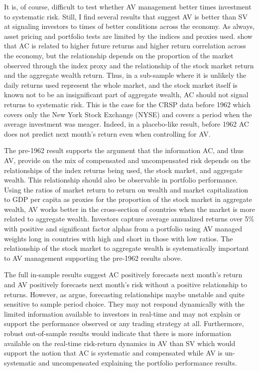 It is, of course, difficult to test whether AV management better times investment to systematic risk. Still, I find several results that suggest AV is better than SV at signaling investors to times of better conditions across the economy. As always, asset pricing and portfolio tests are limited by the indices and proxies used. \citet{pollet_average_2010} show that AC is related to higher future returns and higher return correlation across the economy, but the relationship depends on the proportion of the market observed through the index proxy and the relationship of the stock market return and the aggregate wealth return. Thus, in a sub-sample where it is unlikely the daily returns used represent the whole market, and the stock market itself is known not to be an insignificant part of aggregate wealth, AC should not signal returns to systematic risk. This is the case for the CRSP data before 1962 which covers only the New York Stock Exchange (NYSE) and covers a period when the average investment was meager. \citep{taylor_2014} Indeed, in a placebo-like result, before 1962 AC does not predict next month's return even when controlling for AV.

The pre-1962 result supports the \citet{pollet_average_2010} argument that the information AC, and thus AV, provide on the mix of compensated and uncompensated risk depends on the relationships of the index returns being used, the stock market, and aggregate wealth. This relationship should also be observable in portfolio performance. Using the ratios of market return to return on wealth and market capitalization to GDP per capita as proxies for the proportion of the stock market in aggregate wealth, AV works better in the cross-section of countries when the market is more related to aggregate wealth. Investors capture average annualized returns over 5\% with positive and significant factor alphas from a portfolio using AV managed weights long in countries with high and short in those with low ratios. The relationship of the stock market to aggregate wealth is systematically important to AV management supporting the pre-1962 results above.

The full in-sample results suggest AC positively forecasts next month's return and AV positively forecasts next month's risk without a positive relationship to returns. However, as \citet{Welch2008} argue, forecasting relationships maybe unstable and quite sensitive to sample period choice. They may not respond dynamically with the limited information available to investors in real-time and may not explain or support the performance observed or any trading strategy at all. Furthermore, robust out-of-sample results would indicate that there is more information available on the real-time risk-return dynamics in AV than SV which would support the notion that AC is systematic and compensated while AV is un-systematic and uncompensated explaining the portfolio performance results.

